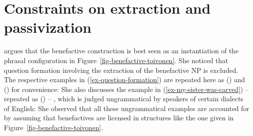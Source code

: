



\section{Constraints on extraction and passivization}
\label{sec-restrictions-lexical}

\citet[]{Toivonen2013a} argues that the benefactive construction is best seen as an
instantiation of the phrasal configuration in Figure~\vref{fig-benefactive-toivonen}.
She noticed that question formation involving the extraction of the benefactive NP is
excluded. The respective examples in (\ref{ex-question-formation}) are repeated here as ()
and () for convenience: 
\eal
{}
\zl
\eal
{}
\zl
She also discusses the example in (\ref{ex-my-sister-was-carved}) -- repeated as () -- , which is judged ungrammatical by speakers of certain
dialects of English:
\z
She observed that all these ungrammatical examples are accounted for by assuming that benefactives
are licensed in structures like the one given in Figure~\ref{fig-benefactive-toivonen}.

